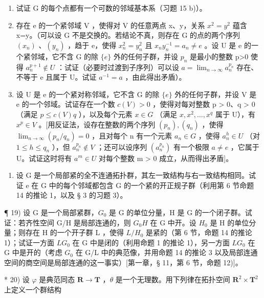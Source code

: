 \begin{enumerate}
\def\labelenumi{\alph{enumi})}
\item
  试证 G 的每个点都有一个可数的邻域基本系（习题 15 b)）。
\item
  存在 e 的一个紧邻域 V ，使得对 V 的任意两点 x、y，关系 \(x^{2}=y^{2}\) 蕴含 x=y。（可以设 G 不是交换的。若结论不真，则存在 G 的点的两个序列 \((x_{n})\) 、\((y_{n})\) ，趋于 e，使得 \(x_{n}^{2}=y_{n}^{2}\) 且 \(x_{n}y_{n}^{-1}=a_{n}\neq e\) 。设 U 是 e 的一个紧邻域，它不含 G 的除 \(\{e\}\) 外的任何子群，并设 \(p_{n}\) 是最小的整数 p\textgreater0 使得 \(a_{n}^{p+1}\notin U\) ：试证（必要时过渡到子序列）可以设 \(a=\lim_{n\to\infty}a_{n}^{p_{n}}\) 存在、不等于 e 且属于 U。试证 \(a^{-1}=a\) ，由此得出矛盾）。
\item
  设 U 是 e 的一个紧对称邻域，它不含 G 的除 \(\{e\}\) 外的任何子群，并设 V 是 e 的一个邻域。试证存在一个数 \(c(V) > 0\) ，使得对每对整数 p \textgreater{} 0、q \textgreater{} 0 （满足 \(p \leqslant c(V)q\) ），以及每个元素 \(x \in G\) （满足 \(x, x^{2}, \ldots, x^{q}\) 属于 U），有 \(x^{p} \in V\) 。{[}用反证法，设存在整数的两个序列 \((p_{n}), (q_{n})\) ，使得 \(\lim_{n \to \infty} (p_{n}/q_{n}) = 0\) ，且对每个 n 有一个元素 \(a_{n} \in G\) ，使得 \(a_{n}^{h} \in U\) （对 \(1 \leqslant h \leqslant q_{n}\) ），但 \(a_{n}^{p_{n}} \notin V\) ；还可以设序列 \((a_{n}^{p_{n}})\) 有一个极限 \(a \neq e\) ，它属于 U。试证这时将有 \(a^{m} \in U\) 对每个整数 m \textgreater{} 0 成立，从而得出矛盾{]}。
\end{enumerate}

\begin{enumerate}
\def\labelenumi{\arabic{enumi})}
\setcounter{enumi}{17}
\tightlist
\item
  设 G 是一个局部紧的全不连通拓扑群，其左一致结构与右一致结构相同。试证 e 在 G 中的每个邻域都包含 G 的一个紧的开正规子群（利用第 6 节命题 14 的推论 1，以及 § 3 的习题 3）。
\end{enumerate}

¶ 19) 设 G 是一个局部紧群，\(G_{0}\) 是 G 的单位分量，H 是 G 的一个闭子群。试证：若齐性空间 G/H 是局部连通的，则 \(G_{0}H\) 在 G 中开。设 \(H_{0}\) 是 H 的单位分量；则存在 H 的一个开子群 L ，使得 \(L/H_{0}\) 是紧的（第 6 节，命题 14 的推论 1）；试证一方面 \(LG_{0}\) 在 G 中是闭的（利用命题 1 的推论 1），另一方面 \(LG_{0}\) 在 G 中是开的（考虑 \(G_{0}\) 在 G/L 中的典范像，并用命题 14 的推论 3 以及局部连通空间的商空间是局部连通的这一事实）{[}第一章，§ 11，第 6 节，命题 12){]}。

* 20) 设 \(\varphi\) 是典范同态 \(\mathbf{R} \to \mathbf{T}\) ，\(\theta\) 是一个无理数。用下列律在拓扑空间 \(\mathbf{R}^2 \times \mathbf{T}^2\) 上定义一个群结构

